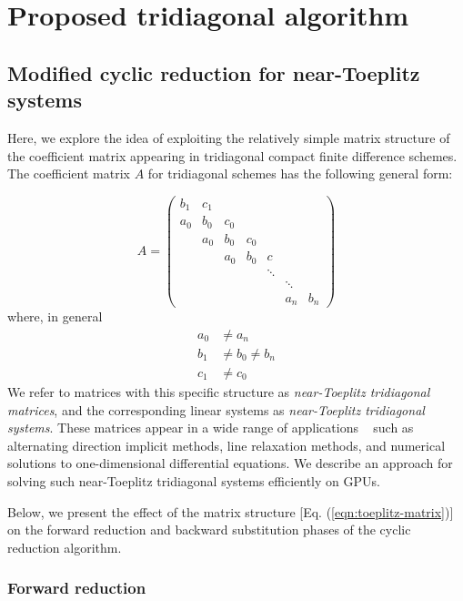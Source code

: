 \chapter{Proposed tridiagonal algorithm}

\section{Modified cyclic reduction for near-Toeplitz systems}

Here, we explore the idea of
exploiting the relatively simple matrix structure
of the coefficient matrix appearing in
tridiagonal compact finite difference schemes.
The coefficient matrix $A$ for tridiagonal schemes
has the following general form:

\begin{equation} \label{eqn:toeplitz-matrix}
A = 
\begin{pmatrix}
     b_1 & c_1  \\
     a_0 & b_0  &  c_0  \\
         & a_0  &  b_0 &  c_0  \\
         &      &  a_0 &  b_0 &  c    \\
         &      &      &      &  \ddots \\
         &      &      &      &     &  \ddots  \\
         &      &      &      &     &  a_n  &  b_n
\end{pmatrix}
\end{equation}
%
where, in general
\begin{align*}
    a_0 &\neq a_n  \\
    b_1 &\neq b_0 \neq b_n \\
    c_1 &\neq c_0 
\end{align*}
%
We refer to matrices with this specific structure as
\emph{near-Toeplitz tridiagonal matrices},
and the corresponding linear systems as
\emph{near-Toeplitz tridiagonal systems}.
These matrices appear in a wide range of applications
~\cite{sun1995application}
such as alternating direction implicit methods,
line relaxation methods,
and numerical solutions to one-dimensional differential equations.
We describe an approach for solving such
near-Toeplitz tridiagonal systems efficiently on GPUs.

Below, we present the effect of the matrix structure
[Eq. (\ref{eqn:toeplitz-matrix})] on the
forward reduction and backward substitution phases of
the cyclic reduction algorithm.

\subsection{Forward reduction}

